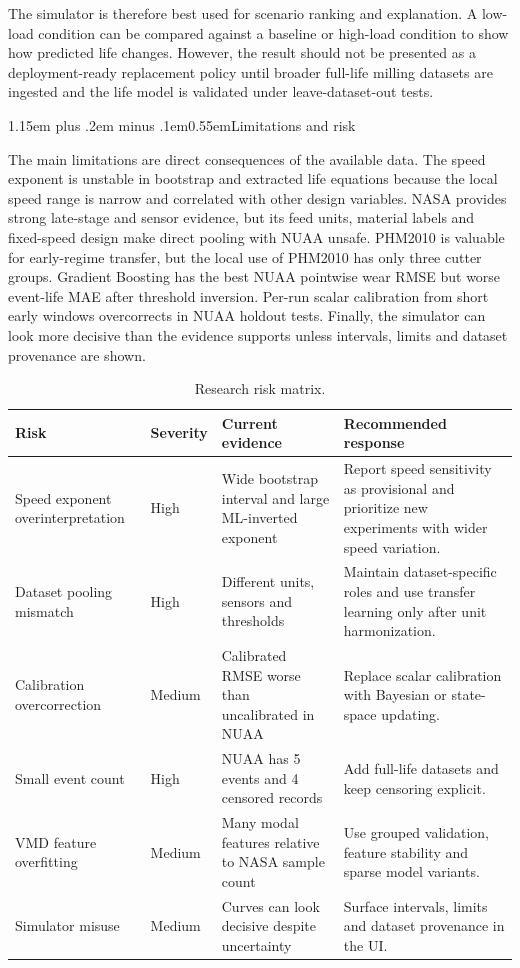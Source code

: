 \documentclass[10pt]{article}
\makeatletter
\renewcommand\section{\@startsection{section}{1}{0pt}%
  {1.15em plus .2em minus .1em}{0.55em}{\normalfont\normalsize\bfseries}}
\makeatother
\begin{document}
The simulator is therefore best used for scenario ranking and explanation. A low-load condition can be compared against a baseline or high-load condition to show how predicted life changes. However, the result should not be presented as a deployment-ready replacement policy until broader full-life milling datasets are ingested and the life model is validated under leave-dataset-out tests.

\section{Limitations and risk}

The main limitations are direct consequences of the available data. The speed exponent is unstable in bootstrap and extracted life equations because the local speed range is narrow and correlated with other design variables. NASA provides strong late-stage and sensor evidence, but its feed units, material labels and fixed-speed design make direct pooling with NUAA unsafe. PHM2010 is valuable for early-regime transfer, but the local use of PHM2010 has only three cutter groups. Gradient Boosting has the best NUAA pointwise wear RMSE but worse event-life MAE after threshold inversion. Per-run scalar calibration from short early windows overcorrects in NUAA holdout tests. Finally, the simulator can look more decisive than the evidence supports unless intervals, limits and dataset provenance are shown.

\begin{table}[!t]
  \centering
  \caption{Research risk matrix.}
  \label{tab:risk-matrix}
  \footnotesize
  \begin{tabularx}{\textwidth}{p{3.2cm}p{1.7cm}p{3.0cm}Y}
    \toprule
    Risk & Severity & Current evidence & Recommended response \\
    \midrule
    Speed exponent overinterpretation & High & Wide bootstrap interval and large ML-inverted exponent & Report speed sensitivity as provisional and prioritize new experiments with wider speed variation. \\
    Dataset pooling mismatch & High & Different units, sensors and thresholds & Maintain dataset-specific roles and use transfer learning only after unit harmonization. \\
    Calibration overcorrection & Medium & Calibrated RMSE worse than uncalibrated in NUAA & Replace scalar calibration with Bayesian or state-space updating. \\
    Small event count & High & NUAA has 5 events and 4 censored records & Add full-life datasets and keep censoring explicit. \\
    VMD feature overfitting & Medium & Many modal features relative to NASA sample count & Use grouped validation, feature stability and sparse model variants. \\
    Simulator misuse & Medium & Curves can look decisive despite uncertainty & Surface intervals, limits and dataset provenance in the UI. \\
    \bottomrule
  \end{tabularx}
\end{table}
\end{document}
